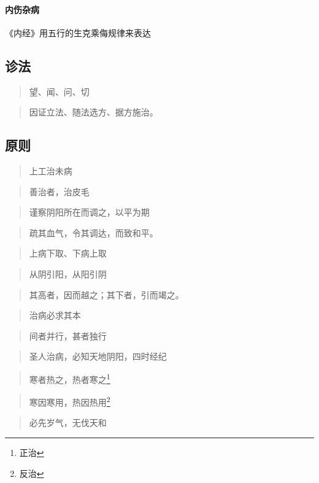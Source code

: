 \paragraph{内伤杂病}《内经》用五行的生克乘侮规律来表达







\subsection{诊法}
\begin{quote}
  望、闻、问、切
\end{quote}
\begin{quote}
  因证立法、随法选方、据方施治。
\end{quote}

\subsection{原则}
\begin{quote}
  上工治未病
\end{quote}
\begin{quote}
  善治者，治皮毛
\end{quote}
\begin{quote}
  谨察阴阳所在而调之，以平为期
\end{quote}
\begin{quote}
  疏其血气，令其调达，而致和平。
\end{quote}
\begin{quote}
  上病下取、下病上取
\end{quote}
\begin{quote}
  从阴引阳，从阳引阴
\end{quote}
\begin{quote}
  其高者，因而越之；其下者，引而竭之。
\end{quote}
\begin{quote}
  治病必求其本
\end{quote}
\begin{quote}
  间者并行，甚者独行
\end{quote}
\begin{quote}
  圣人治病，必知天地阴阳，四时经纪
\end{quote}
\begin{quote}
  寒者热之，热者寒之\footnote{正治}
\end{quote}
\begin{quote}
  寒因寒用，热因热用\footnote{反治}
\end{quote}
\begin{quote}
  必先岁气，无伐天和
\end{quote}
